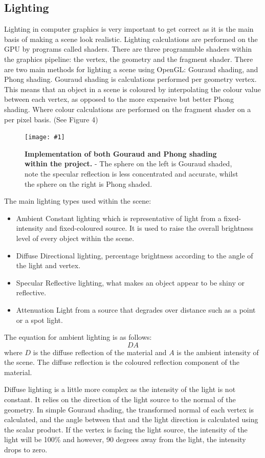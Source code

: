 \documentclass[conference]{acmsiggraph}
\newcommand{\figuremacroW}[4]{
	\begin{figure}[h] %
		\centering
		\texttt{[image: \#1]}
		\caption[#2]{\textbf{#2} - #3}
		\label{fig:#1}
	\end{figure}
}
\begin{document}
\subsection{Lighting}
Lighting in computer graphics is very important to get correct as it is the main basis of making a scene look realistic. Lighting calculations are performed on the GPU by programs called shaders. There are three programmble shaders within the graphics pipeline: the vertex, the geometry and the fragment shader.
    There are two main methods for lighting a scene using OpenGL: Gouraud shading, and Phong shading.
Gouraud shading is %
calculations performed per geometry vertex. This means that an object in a scene is coloured by interpolating the colour value between each vertex, as opposed to the more expensive but better Phong shading. Where colour calculations are performed on the fragment shader on a per pixel basis. (See Figure 4)

\figuremacroW
{gouraudPhong}
{Implementation of both Gouraud and Phong shading within the project. }
{The sphere on the left is Gouraud shaded, note the specular reflection is less concentrated and accurate, whilst the sphere on the right is Phong shaded.}
{1.0}

The main lighting types used within the scene:
\begin{itemize}
    \item {Ambient} Constant lighting which is representative of light from a fixed-intensity and fixed-coloured source. It is used to raise the overall brightness level of every object within the scene. 
    \item {Diffuse} Directional lighting, percentage brightness according to the angle of the light and vertex.
    \item {Specular} Reflective lighting, what makes an object appear to be shiny or reflective.
    \item {Attenuation} Light from a source that degrades over distance such as a point or a spot light.
\end{itemize}

The equation for ambient lighting is as follows:
\begin{equation} \label{ambientLightingEq}
    DA
\end{equation}
where $D$ is the diffuse reflection of the material and $A$ is the ambient intensity of the scene. The diffuse reflection is the coloured reflection component of the material.

Diffuse lighting is a little more complex as the intensity of the light is not constant. It relies on the direction of the light source to the normal of the geometry. In simple Gouraud shading, the transformed normal of each vertex is calculated, and the angle between that and the light direction is calculated using the scalar product. If the vertex is facing the light source, the intensity of the light will be 100\% and however, 90 degrees away from the light, the intensity drops to zero.
\end{document}

